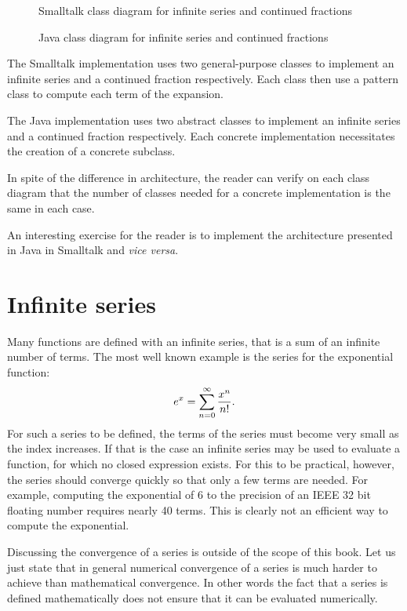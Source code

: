 \documentclass[twoside]{book}
\begin{document}
\begin{figure}
\center{}
\caption{Smalltalk class diagram for infinite series and continued
fractions}\label{fig:StSeriesClass}
\end{figure}
\begin{figure}
\center{}
\caption{Java class diagram for infinite series and continued
fractions}\label{fig:JvSeriesClass}
\end{figure}

The Smalltalk implementation uses two general-purpose classes to
implement an infinite series and a continued fraction
respectively. Each class then use a  pattern
class \cite{GoF} to compute each term of the expansion.

The Java implementation uses two abstract classes to implement an
infinite series and a continued fraction respectively. Each
concrete implementation necessitates the creation of a concrete
subclass.

In spite of the difference in architecture, the reader can verify
on each class diagram that the number of classes needed for a
concrete implementation is the same in each case.

An interesting exercise for the reader is to implement the
architecture presented in Java in Smalltalk and {\it vice versa}.

\section{Infinite series}
Many functions are defined with an infinite series, that is a sum
of an infinite number of terms. The most well known example is the
series for the exponential function:
\begin{equation}
  e^x=\sum_{n=0}^{\infty}{x^n \over n!}.
\end{equation}
For such a series to be defined, the terms of the series must
become very small as the index increases. If that is the case an
infinite series may be used to evaluate a function, for which no
closed expression exists. For this to be practical, however, the
series should converge quickly so that only a few terms are
needed. For example, computing the exponential of 6 to the
precision of an IEEE 32 bit floating number requires nearly 40
terms. This is clearly not an efficient way to compute the
exponential.

Discussing the convergence of a series is outside of the scope of
this book. Let us just state that in general numerical convergence
of a series is much harder to achieve than mathematical
convergence. In other words the fact that a series is defined
mathematically does not ensure that it can be evaluated
numerically.
\end{document}

